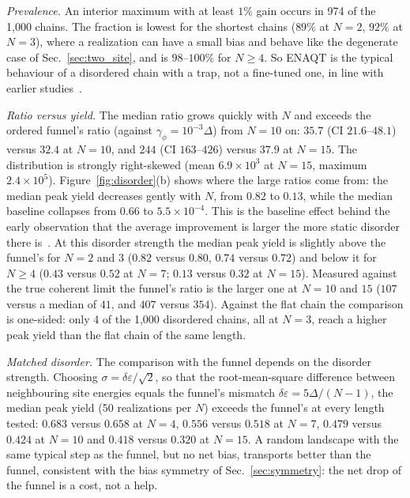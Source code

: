 \documentclass[aps,pre,preprint,floatfix]{revtex4-2}
\newcommand{\gp}{\gamma_\phi}
\newcommand{\dE}{\delta\varepsilon}
\begin{document}
\textit{Prevalence.}
An interior maximum with at least $1\%$ gain occurs in 974 of the 1{,}000
chains.
The fraction is lowest for the shortest chains ($89\%$ at $N=2$, $92\%$ at
$N=3$), where a realization can have a small bias and behave like the
degenerate case of Sec.~\ref{sec:two_site}, and is $98$--$100\%$ for
$N\ge4$.
So ENAQT is the typical behaviour of a disordered chain with a trap, not a
fine-tuned one, in line with earlier
studies~\cite{moix2013,novo2016,zhang2017,zerahharush2020,coates2021}.

\textit{Ratio versus yield.}
The median ratio grows quickly with $N$ and exceeds the ordered funnel's ratio
(against $\gp=10^{-3}\Delta$) from $N=10$ on: $35.7$ (CI $21.6$--$48.1$)
versus $32.4$ at $N=10$, and $244$ (CI $163$--$426$) versus $37.9$ at $N=15$.
The distribution is strongly right-skewed (mean $6.9\times10^{3}$ at $N=15$,
maximum $2.4\times10^{5}$).
Figure~\ref{fig:disorder}(b) shows where the large ratios come from: the median
peak yield decreases gently with $N$, from $0.82$ to $0.13$, while the median
baseline collapses from $0.66$ to $5.5\times10^{-4}$.
This is the baseline effect behind the early observation that the average
improvement is larger the more static disorder there
is~\cite{rebentrost2009}.
At this disorder strength the median peak yield is slightly above the funnel's
for $N=2$ and $3$ ($0.82$ versus $0.80$, $0.74$ versus $0.72$) and below it
for $N\ge4$ ($0.43$ versus $0.52$ at $N=7$; $0.13$ versus $0.32$ at $N=15$).
Measured against the true coherent limit the funnel's ratio is the larger one
at $N=10$ and $15$ ($107$ versus a median of $41$, and $407$ versus $354$).
Against the flat chain the comparison is one-sided: only 4 of the 1{,}000
disordered chains, all at $N=3$, reach a higher peak yield than the flat chain
of the same length.

\textit{Matched disorder.}
The comparison with the funnel depends on the disorder strength.
Choosing $\sigma=\dE/\sqrt{2}$, so that the root-mean-square difference
between neighbouring site energies equals the funnel's mismatch
$\dE=5\Delta/(N-1)$, the median peak yield (50 realizations per $N$) exceeds
the funnel's at every length tested: $0.683$ versus $0.658$ at $N=4$,
$0.556$ versus $0.518$ at $N=7$, $0.479$ versus $0.424$ at $N=10$ and
$0.418$ versus $0.320$ at $N=15$.
A random landscape with the same typical step as the funnel, but no net
bias, transports better than the funnel, consistent with the bias symmetry of
Sec.~\ref{sec:symmetry}: the net drop of the funnel is a cost, not a help.
\end{document}
